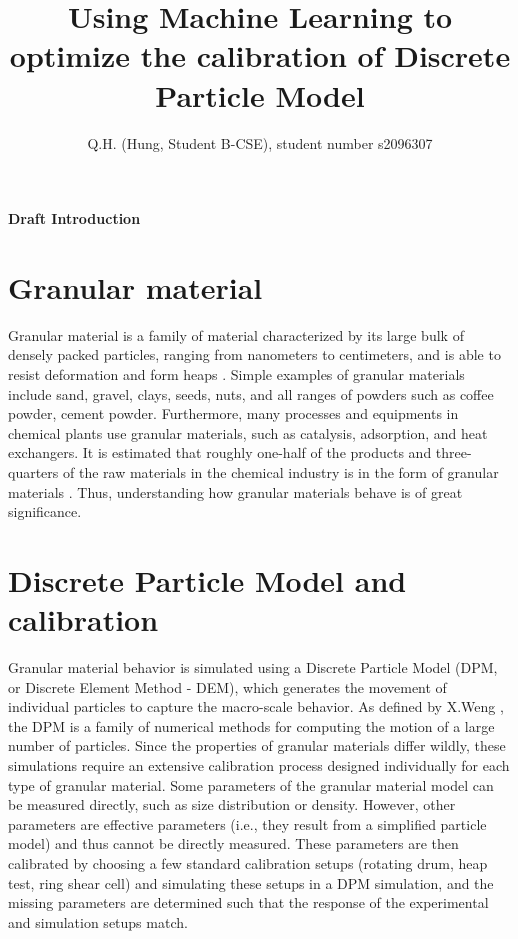 \documentclass{article}
\title{Using Machine Learning to optimize the calibration of Discrete Particle Model}
\author{Q.H. (Hung, Student B-CSE), student number s2096307}
\begin{document}
\maketitle
\begin {center}
\textbf{\LARGE Draft Introduction}
\end{center}

\section{Granular material}

 Granular material is a family of material characterized by its large bulk of densely packed particles, ranging from nanometers to centimeters, and is able to resist deformation and form heaps \cite{introGranular2, introGranular3}. Simple examples of granular materials include sand, gravel, clays, seeds, nuts, and all ranges of powders such as coffee powder, cement powder. Furthermore, many processes and equipments in chemical plants use granular materials, such as catalysis, adsorption, and heat exchangers. It is estimated that roughly one-half of the products and three-quarters of the raw materials in the chemical industry is in the form of granular materials \cite{introGranular}. Thus, understanding how granular materials behave is of great significance.

\section{Discrete Particle Model and calibration}

Granular material behavior is simulated using a Discrete Particle Model (DPM, or Discrete Element Method - DEM), which generates the movement of individual particles to capture the macro-scale behavior. As defined by X.Weng \cite{Weng:2015}, the DPM is a family of numerical methods for computing the motion of a large number of particles. Since the properties of granular materials differ wildly, these simulations require an extensive calibration process designed individually for each type of granular material. Some parameters of the granular material model can be measured directly, such as size distribution or density. However, other parameters are effective parameters (i.e., they result from a simplified particle model) and thus cannot be directly measured. These parameters are then calibrated by choosing a few standard calibration setups (rotating drum, heap test, ring shear cell) and simulating these setups in a DPM simulation, and the missing parameters are determined such that the response of the experimental and simulation setups match. 
\end{document}
